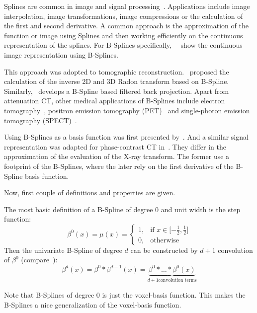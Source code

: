 Splines are common in image and signal processing~\cite{unser_splines_1999}. Applications include
image interpolation, image transformations, image compressions or the calculation of the first and
second derivative. A common approach is the approximation of the function or image using Splines and
then working efficiently on the continuous representation of the splines. For B-Splines
specifically,~\citeauthor*{unser_fast_1991}~\cite{unser_fast_1991} show the continuous image
representation using B-Splines.

This approach was adopted to tomographic reconstruction.~\cite{la_riviere_spline-based_1998}
proposed the calculation of the inverse 2D and 3D Radon transform based on B-Spline.
Similarly,~\cite{horbelt_discretization_2002} develops a B-Spline based filtered back projection.
Apart from attenuation CT, other medical applications of B-Splines include electron
tomography~\cite{tran_robust_2013, tran_inverse_2014}, positron emission tomography
(PET)~\cite{nichols_spatiotemporal_2002, li_fast_2007, verhaeghe_investigation_2007} and
single-photon emission tomography (SPECT)~\cite{guedon_b-spline_1991, reutter_fully_2007}.

Using B-Splines as a basis function was first presented by~\cite{momey_new_2011,
	momey_b-spline_2012, momey_spline_2015}. And a similar signal representation was adapted for
phase-contrast CT in~\cite{nilchian_fast_2013, nilchian_differential_2012, nilchian_spline_2015}.
They differ in the approximation of the evaluation of the X-ray transform. The former use a
footprint of the B-Splines, where the later rely on the first derivative of the B-Spline basis
function.

Now, first couple of definitions and properties are given.
\begin{definition}[B-Spline]
	The most basic definition of a B-Spline of degree \(0\) and unit width is the step function:
	\begin{equation}
		\beta^0(x) = \mu(x) =
		\begin{cases}
			1, & \text{if } x \in \mathopen[\minus \frac{1}{2}, \frac{1}{2}\mathclose] \\
			0, & \text{otherwise}
		\end{cases}
	\end{equation}
	Then the univariate B-Spline of degree \(d\) can be constructed by \(d + 1\) convolution of
	\(\beta^0\) (compare~\cite{momey_new_2011}):
	\begin{equation}
		\beta^d(x) = \beta^0 * \beta^{d-1}(x) = \underbrace{\beta^0 * \dots * \beta^0(x)}_{d+1 \text{convolution terms}}
	\end{equation}
\end{definition}
Note that B-Splines of degree \(0\) is just the voxel-basis function. This makes the B-Splines a
nice generalization of the voxel-basis function.

